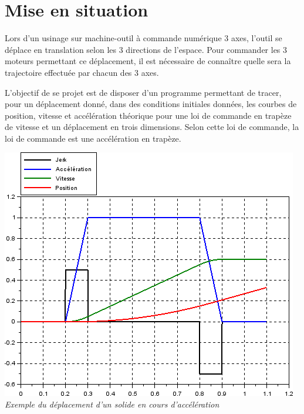 \documentclass[10pt]{article}
\newif\ifxp
\begin{document}
\ifxp

\else

\fi



 \renewcommand{\baselinestretch}{1.2}
\setlength{\parskip}{2ex plus 0.5ex minus 0.2ex}



\section{Mise en situation}
\begin{minipage}[c]{.53\linewidth}
Lors d'un usinage sur machine-outil à commande numérique 3 axes, l'outil se déplace en translation selon les 3 directions de l'espace. Pour commander les 3 moteurs permettant ce déplacement, il est nécessaire de connaître quelle sera la trajectoire effectuée par chacun des 3 axes.
\begin{obj}
L'objectif de se projet est de disposer d'un programme permettant de tracer, pour un déplacement donné, dans des conditions initiales données, les courbes de position, vitesse et accélération théorique pour une loi de commande en trapèze de vitesse et un déplacement en trois dimensions. Selon cette loi de commande, la loi de commande est une accélération en trapèze.
\end{obj}


\end{minipage} \hfill
\begin{minipage}[c]{.45\linewidth}
\begin{center}
\includegraphics[width=\textwidth]{images/bang}
\textit{Exemple du déplacement d'un solide en cours d'accélération}
\end{center}
\end{minipage}
\end{document}
